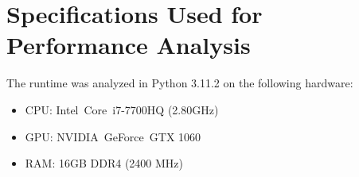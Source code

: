 \documentclass[sigconf, fleqn, prologue, dvipsnames]{acmart}
\begin{document}
\section{Specifications Used for Performance Analysis}
\label{sec:specs}
The runtime was analyzed in Python 3.11.2 on the following hardware:
\begin{itemize}
	\item CPU: Intel\textregistered\ Core\texttrademark\ i7-7700HQ (2.80GHz)
	\item GPU: NVIDIA\textregistered\ GeForce\texttrademark\ GTX 1060
	\item RAM: 16GB DDR4 (2400 MHz)
\end{itemize}
\end{document}
